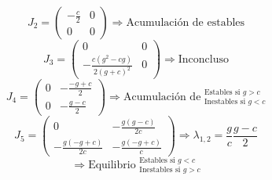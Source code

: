 \documentclass[twocolumn,aps,prl]{revtex4-1}
\begin{document}
$$
J_2=
\begin{pmatrix}
    -\frac{c}{2}
    &
    0
    \\  
    0
    &
    0
\end{pmatrix}
\Rightarrow \text{Acumulación de estables} 
$$
$$
J_3 =
\begin{pmatrix}
    0
    &
    0
    \\  
    -\frac{c\left(g^2-cg\right)}{2\left(g+c\right)^2}
    &
    0
\end{pmatrix}
\Rightarrow \text{Inconcluso}
$$
$$
J_4 =
\begin{pmatrix}
    0
    &
    -\frac{-g+c}{2}
    \\  
    0
    &
    -\frac{g-c}{2}
\end{pmatrix}
\Rightarrow \text{Acumulación de } ^{\text{Estables si } g>c}_{\text{Inestables si } g<c}
$$
$$
J_5 =
\begin{pmatrix}
    0
    &
    -\frac{g\left(g-c\right)}{2c}
    \\  
    -\frac{g\left(-g+c\right)}{2c}
    &
    -\frac{g\left(-g+c\right)}{c}
\end{pmatrix}
\Rightarrow  \lambda_{1,2} = \frac{g}{c} \frac{g-c}{2}
$$
$$
\Rightarrow \text{Equilibrio }  ^{\text{Estables si } g<c}_{\text{Inestables si } g>c}
$$
\end{document}
